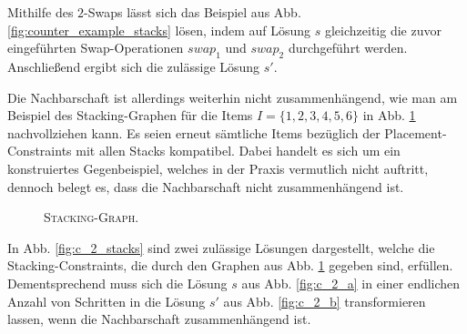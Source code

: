 Mithilfe des $2$-Swaps lässt sich das Beispiel aus Abb. \ref{fig:counter_example_stacks} lösen,
indem auf Lösung $s$ gleichzeitig die zuvor eingeführten Swap-Operationen $swap_1$ und $swap_2$ durchgeführt werden.
Anschließend ergibt sich die zulässige Lösung $s'$.

\vfill
\pagebreak

Die Nachbarschaft ist allerdings weiterhin nicht zusammenhängend, wie man am Beispiel des Stacking-Graphen
für die Items $I = \{1, 2, 3, 4, 5, 6\}$ in Abb. \ref{fig:counter_2_stacking_graph} nachvollziehen kann.
Es seien erneut sämtliche Items bezüglich der Placement-Constraints mit allen Stacks kompatibel.
Dabei handelt es sich um ein konstruiertes Gegenbeispiel, welches in der Praxis vermutlich nicht auftritt,
dennoch belegt es, dass die Nachbarschaft nicht zusammenhängend ist.
\begin{figure}[H]
  \centering
  \caption{\textsc{Stacking-Graph}.}
  \label{fig:counter_2_stacking_graph}
\end{figure}

In Abb. \ref{fig:c_2_stacks} sind zwei zulässige Lösungen dargestellt, welche die Stacking-Constraints, die durch den
Graphen aus Abb. \ref{fig:counter_2_stacking_graph} gegeben sind, erfüllen. Dementsprechend muss sich die Lösung $s$
aus Abb. \ref{fig:c_2_a} in einer endlichen Anzahl von Schritten in die Lösung $s'$ aus Abb. \ref{fig:c_2_b} transformieren lassen,
wenn die Nachbarschaft zusammenhängend ist.

